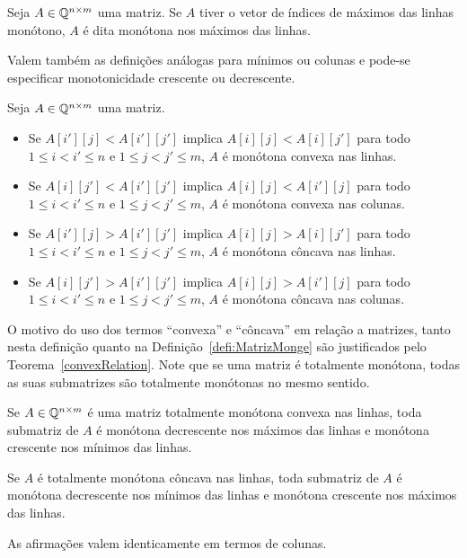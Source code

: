 \begin{defi}
Seja $A \in \mathbb{Q}^{n \times m}$ uma matriz. Se $A$ tiver o vetor de índices de máximos das linhas monótono, $A$ é dita monótona nos máximos das linhas. 

Valem também as definições análogas para mínimos ou colunas e pode-se especificar monotonicidade crescente ou decrescente.
\end{defi}

\begin{defi}
Seja $A \in \mathbb{Q}^{n \times m}$ uma matriz.
    \begin{itemize}
        \item Se $A[i'][j] < A[i'][j']$ implica $A[i][j] < A[i][j']$ para todo $1 \leq i < i' \leq n$ e $1 \leq j < j' \leq m$, $A$ é monótona convexa nas linhas.
        \item Se $A[i][j'] < A[i'][j']$ implica $A[i][j] < A[i'][j]$ para todo $1 \leq i < i' \leq n$ e $1 \leq j < j' \leq m$, $A$ é monótona convexa nas colunas.
        \item Se $A[i'][j] > A[i'][j']$ implica $A[i][j] > A[i][j']$ para todo $1 \leq i < i' \leq n$ e $1 \leq j < j' \leq m$, $A$ é monótona côncava nas linhas.
        \item Se $A[i][j'] > A[i'][j']$ implica $A[i][j] > A[i'][j]$ para todo $1 \leq i < i' \leq n$ e $1 \leq j < j' \leq m$, $A$ é monótona côncava nas colunas.
    \end{itemize}
\end{defi}

O motivo do uso dos termos ``convexa'' e ``côncava'' em relação a matrizes, tanto nesta definição quanto na Definição~\ref{defi:MatrizMonge} são justificados pelo Teorema~\ref{convexRelation}. Note que se uma matriz é totalmente monótona, todas as suas submatrizes são totalmente monótonas no mesmo sentido.

\begin{lema}
Se $A \in \mathbb{Q}^{n \times m}$ é uma matriz totalmente monótona convexa nas linhas, toda submatriz de $A$ é monótona decrescente nos máximos das linhas e monótona crescente nos mínimos das linhas.  

Se $A$ é totalmente monótona côncava nas linhas, toda submatriz de $A$ é monótona decrescente nos mínimos das linhas e monótona crescente nos máximos das linhas.  

As afirmações valem identicamente em termos de colunas.
\end{lema}

